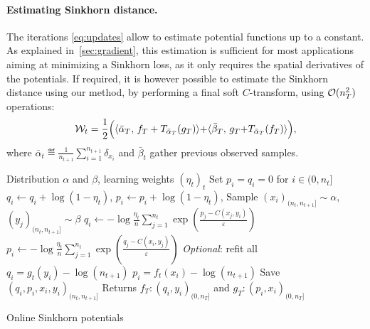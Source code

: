 \paragraph{Estimating Sinkhorn distance.} 

The iterations \eqref{eq:updates} allow to estimate potential functions up to a constant. As explained in~\autoref{sec:gradient},
this estimation is sufficient for most applications aiming at minimizing a Sinkhorn loss, as it only requires the spatial derivatives of the potentials.
%
If required, it is however possible to estimate the Sinkhorn distance using our method, by performing a final soft $C$-transform, using $\Oo(n_T^2)$ operations:
\begin{equation}\label{eq-dist-est}
    \Ww_t = \frac{1}{2}\Big(\dotp{\bar \alpha_T}{f_T + \Ctrans{g_T}{\bar \alpha_T}}
     {+} \dotp{\bar \beta_T}{g_T {+} \Ctrans{f_T}{\bar \alpha_T}}\Big),
\end{equation}
where $\bar \alpha_t \eqdef \frac{1}{n_{t+1}}\sum_{i=1}^{n_{t+1}} \delta_{x_i}$
and $\bar \beta_t$ gather previous observed samples.

\begin{algorithm}[t]
    \begin{algorithmic}
    \Input Distribution $\alpha$ and $\beta$, learning weights ${(\eta_t)}_t$
    \State Set $p_i = q_i = 0$ for $i \in (0, n_t]$
        \For{$i \in (0, n_t]$}
        \State $q_i \gets q_i + \log(1 - \eta_t)$, $p_i \gets p_i + \log(1 - \eta_t)$,
        \EndFor
        \State Sample $(x_i)_{(n_t, n_{t+1}]} \sim \alpha$, $(y_j)_{(n_t, n_{t+1}]} \sim \beta$
        \For{$i \in (n_t, n_{t+1}]$}
            \State $q_i \gets 
            - \log \frac{\eta_t}{n} 
            \sum_{j=1}^{n_t} \exp(\frac{p_j - C(x_j, y_i)}{\varepsilon})$
            \State $p_i \gets 
            - \log \frac{\eta_t}{n} 
            \sum_{j=1}^{n_t} \exp(\frac{q_j - C(x_i, y_j)}{\varepsilon})$
        \EndFor
        \State \textit{Optional}: refit all $q_i = g_t(y_i) - \log (n_{t+1})$
        \State\hspace{2.45cm} $p_i = f_t(x_i) - \log (n_{t+1})$
        \State Save $(q_i, p_i, x_i, y_i)_{(n_t,n_{t+1}]}$
    \EndFor
    \State Returns $f_T : (q_i, y_i)_{(0, n_T]}$ and
    $g_T : (p_i, x_i)_{(0, n_T]}$
    \end{algorithmic}
    \caption{Online Sinkhorn potentials}\label{alg:online_sinkhorn}
\end{algorithm}


